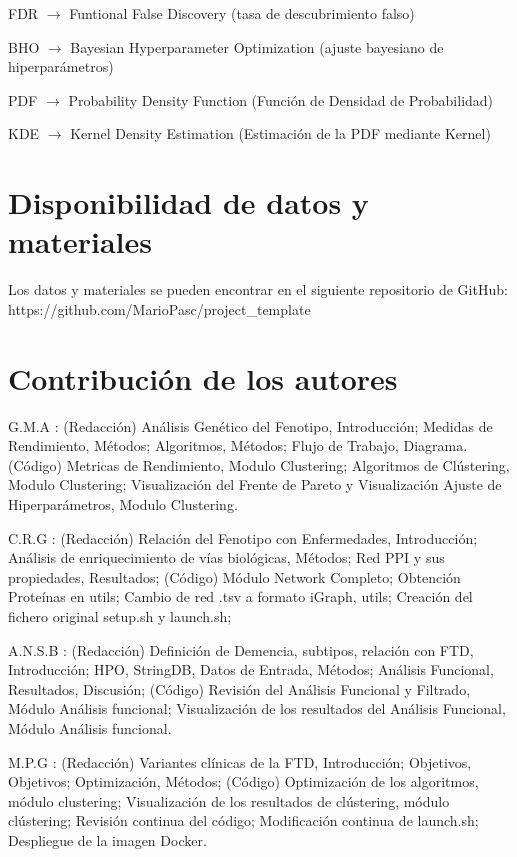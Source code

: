 \documentclass{bmcart}
\begin{document}
\begin{backmatter}
			FDR $\rightarrow$ Funtional False Discovery (tasa de descubrimiento falso)
			
			BHO $\rightarrow$ Bayesian Hyperparameter Optimization (ajuste bayesiano de hiperparámetros)	
			
			PDF $\rightarrow$ Probability Density Function (Función de Densidad de Probabilidad)
			
			KDE $\rightarrow$ Kernel Density Estimation (Estimación de la PDF mediante Kernel)
			
		
		\section*{Disponibilidad de datos y materiales}%
			Los datos y materiales se pueden encontrar en el siguiente repositorio de GitHub: https://github.com/MarioPasc/project\_template
		
		\section*{Contribución de los autores}
		
			G.M.A : (Redacción) Análisis Genético del Fenotipo, Introducción; Medidas de Rendimiento, Métodos; Algoritmos, Métodos; Flujo de Trabajo, Diagrama. (Código) Metricas de Rendimiento, Modulo Clustering; Algoritmos de Clústering, Modulo Clustering; Visualización del Frente de Pareto y Visualización Ajuste de Hiperparámetros, Modulo Clustering. 
			
			C.R.G : (Redacción) Relación del Fenotipo con Enfermedades, Introducción; Análisis de enriquecimiento de vías biológicas, Métodos; Red PPI y sus propiedades, Resultados; (Código) Módulo Network Completo; Obtención Proteínas en utils; Cambio de red .tsv a formato iGraph, utils; Creación del fichero original setup.sh y launch.sh; 
			
			A.N.S.B : (Redacción) Definición de Demencia, subtipos, relación con FTD, Introducción; HPO, StringDB, Datos de Entrada, Métodos; Análisis Funcional, Resultados, Discusión; (Código) Revisión del Análisis Funcional y Filtrado, Módulo Análisis funcional; Visualización de los resultados del Análisis Funcional, Módulo Análisis funcional. 
			
			M.P.G : (Redacción) Variantes clínicas de la FTD, Introducción; Objetivos, Objetivos; Optimización, Métodos; (Código) Optimización de los algoritmos, módulo clustering; Visualización de los resultados de clústering, módulo clústering; Revisión continua del código; Modificación continua de launch.sh; Despliegue de la imagen Docker. 
			

\end{backmatter}
\end{document}
